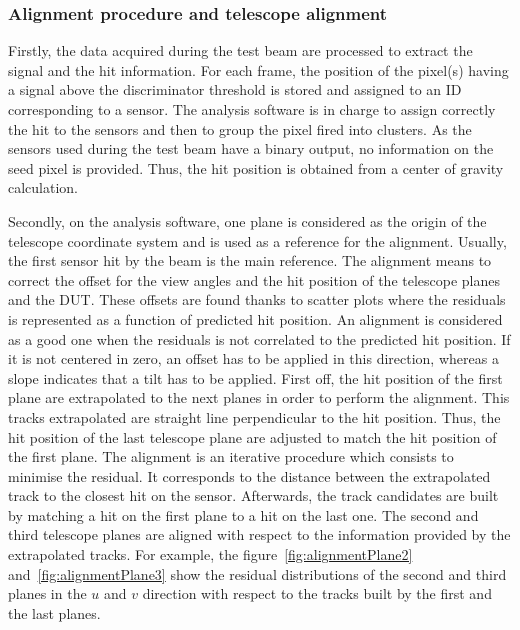      \subsubsection{Alignment procedure and telescope alignment}

      Firstly, the data acquired during the test beam are processed to extract the signal and the hit information.
      For each frame, the position of the pixel(s) having a signal above the discriminator threshold is stored and assigned to an ID corresponding to a sensor.
      The analysis software is in charge to assign correctly the hit to the sensors and then to group the pixel fired into clusters.
      As the sensors used during the test beam have a binary output, no information on the seed pixel is provided.
      Thus, the hit position is obtained from a center of gravity calculation.

      Secondly, on the analysis software, one plane is considered as the origin of the telescope coordinate system and is used as a reference for the alignment.
      Usually, the first sensor hit by the beam is the main reference.
      The alignment means to correct the offset for the view angles and the hit position of the telescope planes and the \gls{DUT}.
      These offsets are found thanks to scatter plots where the residuals is represented as a function of predicted hit position.
      An alignment is considered as a good one when the residuals is not correlated to the predicted hit position.
      If it is not centered in zero, an offset has to be applied in this direction, whereas a slope indicates that a tilt has to be applied.
      First off, the hit position of the first plane are extrapolated to the next planes in order to perform the alignment.
      This tracks extrapolated are straight line perpendicular to the hit position.
      Thus, the hit position of the last telescope plane are adjusted to match the hit position of the first plane.
      The alignment is an iterative procedure which consists to minimise the residual. 
      It corresponds to the distance between the extrapolated track to the closest hit on the sensor.
      Afterwards, the track candidates are built by matching a hit on the first plane to a hit on the last one.
      The second and third telescope planes are aligned with respect to the information provided by the extrapolated tracks.
      For example, the figure~\ref{fig:alignmentPlane2} and~\ref{fig:alignmentPlane3} show the residual distributions of the second and third planes in the $u$ and $v$ direction with respect to the tracks built by the first and the last planes.

